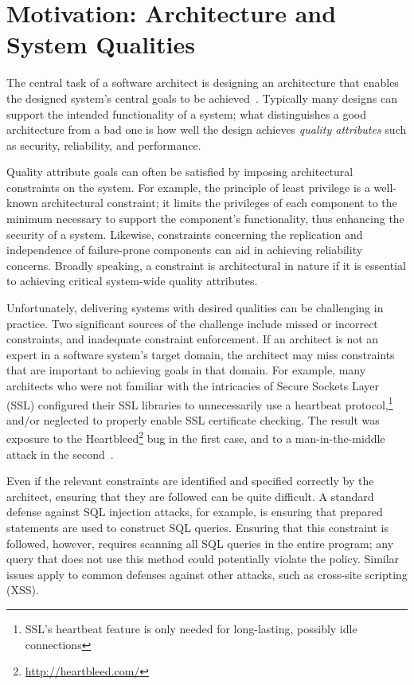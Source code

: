 \documentclass[runningheads]{llncs}
\begin{document}
\begin{sloppypar}
\section{Motivation: Architecture and System Qualities}
The central task of a software architect is designing an architecture that enables the designed system's central goals to be achieved~\cite{BCK03}.  Typically many designs can support the intended functionality of a system; what distinguishes a good architecture from a bad one is how well the design achieves \emph{quality attributes} such as security, reliability, and performance.

Quality attribute goals can often be satisfied by imposing architectural constraints on the system.  For example, the principle of least privilege is a well-known architectural constraint; it limits the privileges of each component to the minimum necessary to support the component's functionality, thus enhancing the security of a system.  Likewise, constraints concerning the replication and independence of failure-prone components can aid in achieving reliability concerns.  Broadly speaking, a constraint is architectural in nature if it is essential to achieving critical system-wide quality attributes.

Unfortunately, delivering systems with desired qualities can be challenging in practice.  Two significant sources of the challenge include missed or incorrect constraints, and inadequate constraint enforcement.  If an architect is not an expert in a software system's target domain, the architect may miss constraints that are important to achieving goals in that domain.  For example, many architects who were not familiar with the intricacies of Secure Sockets Layer (SSL) configured their SSL libraries to unnecessarily use a heartbeat protocol,\footnote{SSL's heartbeat feature is only needed for long-lasting, possibly idle connections} and/or neglected to properly enable SSL certificate checking.  The result was exposure to the Heartbleed\footnote{\url{http://heartbleed.com/}} bug in the first case, and to a man-in-the-middle attack in the second~\cite{GIJABS12}.

Even if the relevant constraints are identified and specified correctly by the architect, ensuring that they are followed can be quite difficult.  A standard defense against SQL injection attacks, for example, is ensuring that prepared statements are used to construct SQL queries.  Ensuring that this constraint is followed, however, requires scanning all SQL queries in the entire program; any query that does not use this method could potentially violate the policy.  Similar issues apply to common defenses against other attacks, such as cross-site scripting (XSS).


\end{sloppypar}
\end{document}
